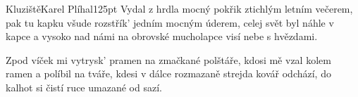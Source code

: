 \begin{song}{Kluziště}{Karel Plíhal}{125pt}
%
Vydal z hrdla mocný pokřik ztichlým letním večerem,
pak tu kapku všude rozstřík' jedním mocným úderem,
celej svět byl náhle v kapce a vysoko nad námi
na obrovské mucholapce visí nebe s hvězdami.
\repchor

%
Zpod víček mi vytrysk' pramen na zmačkané polštáře,
kdosi mě vzal kolem ramen a políbil na tváře,
kdesi v dálce rozmazaně strejda kovář odchází,
do kalhot si čistí ruce umazané od sazí.
\end{song}
\vfil
\hfil{}
